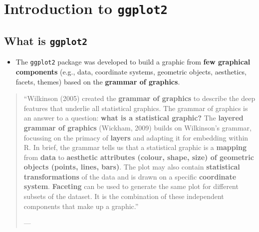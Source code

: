 \documentclass[]{book}
\providecommand{\tightlist}{%
  \setlength{\itemsep}{0pt}\setlength{\parskip}{0pt}}
\begin{document}
\chapter{\texorpdfstring{Introduction to
\texttt{ggplot2}}{Introduction to ggplot2}}\label{introduction-to-ggplot2}

\section{\texorpdfstring{What is
\texttt{ggplot2}}{What is ggplot2}}\label{what-is-ggplot2}

\begin{itemize}
\tightlist
\item
  The \texttt{ggplot2} package \citep{ggplot2} was developed to build a
  graphic from \textbf{few graphical components} (e.g., data, coordinate
  systems, geometric objects, aesthetics, facets, themes) based on the
  \textbf{grammar of graphics}.
\end{itemize}

\begin{quote}
``Wilkinson (2005) created the \textbf{grammar of graphics} to describe
the deep features that underlie all statistical graphics. The grammar of
graphics is an answer to a question: \textbf{what is a statistical
graphic?} The \textbf{layered grammar of graphics} (Wickham, 2009)
builds on Wilkinson's grammar, focussing on the primacy of
\textbf{layers} and adapting it for embedding within R. In brief, the
grammar tells us that a statistical graphic is a \textbf{mapping} from
\textbf{data} to \textbf{aesthetic attributes (colour, shape, size) of
geometric objects (points, lines, bars)}. The plot may also contain
\textbf{statistical transformations} of the data and is drawn on a
specific \textbf{coordinate system}. \textbf{Faceting} can be used to
generate the same plot for different subsets of the dataset. It is the
combination of these independent components that make up a graphic.''

--- \citet{ggplot2}
\end{quote}
\end{document}
